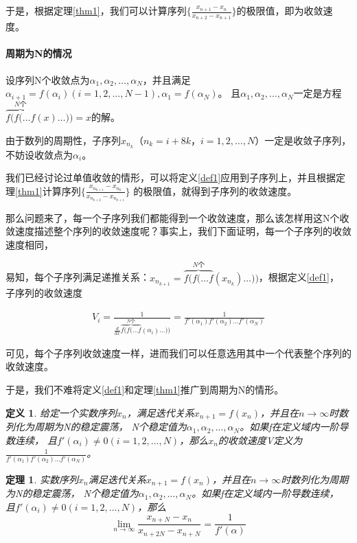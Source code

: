 \documentclass[10pt, a4paper]{article}
\newtheorem{definition}{\hspace{2em}定义}
\newtheorem{theorem}{\hspace{2em}定理}
\begin{document}
        于是，根据定理\ref{thm1}，我们可以计算序列$\{\frac{x_{n+1}-x_n}{x_{n+2}-x_{n+1}}\}$的极限值，即为收敛速度。

    \paragraph{周期为N的情况}

    设序列N个收敛点为$\alpha_1,\alpha_2,\dots ,\alpha_N$，并且满足$\alpha_{i+1}=f(\alpha_i)(i=1,2,\dots,N-1),\alpha_1=f(\alpha_N)$。
    且$\alpha_1,\alpha_2,\dots ,\alpha_N$一定是方程$\overbrace{f(f(\dots f}^{N\text{个}}(x)\dots))=x$的解。

    由于数列的周期性，子序列{$x_{n_k}$}（$n_k=i+8k，i=1,2,\dots,N$）一定是收敛子序列，不妨设收敛点为$\alpha_i$。

    我们已经讨论过单值收敛的情形，可以将定义\ref{def1}应用到子序列上，并且根据定理\ref{thm1}计算序列$\{\frac{x_{n_{k+1}}-x_{n_k}}{x_{n_{k+2}}-x_{n_{k+1}}}\}$
    的极限值，就得到子序列的收敛速度。

    那么问题来了，每一个子序列我们都能得到一个收敛速度，那么该怎样用这N个收敛速度描述整个序列的收敛速度呢？事实上，我们下面证明，每一个子序列的收敛速度相同，
    
    易知，每个子序列满足递推关系：$x_{n_{k+1}}=\overbrace{f(f(\dots f}^{N\text{个}}(x_{n_k})\dots))$，根据定义\ref{def1}，
    子序列的收敛速度
    
    \begin{align}
        V_i=\frac{1}{\frac{d}{dx}\overbrace{f(f(\dots f}^{N\text{个}}(\alpha_i)\dots))}=\frac{1}{f'(\alpha_1)f'(\alpha_2)\dots f'(\alpha_N)}
    \end{align}\label{每个子序列收敛速度一样}
    
    可见，每个子序列收敛速度一样，进而我们可以任意选用其中一个代表整个序列的收敛速度。

    于是，我们不难将定义\ref{def1}和定理\ref{thm1}推广到周期为N的情形。

    \begin{definition}\label{def2}
        给定一个实数序列${x_n}$，满足迭代关系$x_{n+1}=f(x_n)$，并且在$n \to \infty$时数列化为周期为N的稳定震荡，
        N个稳定值为$\alpha_1,\alpha_2,\dots ,\alpha_N$。如果f在定义域内一阶导数连续，
        且$f'(\alpha_i)\neq 0(i=1,2,\dots,N)$，那么${x_n}$的收敛速度V定义为$\frac{1}{f'(\alpha_1)f'(\alpha_2)\dots f'(\alpha_N)}$。
    \end{definition}

    \begin{theorem}\label{thm2}
        实数序列${x_n}$满足迭代关系$x_{n+1}=f(x_n)$，并且在$n \to \infty$时数列化为周期为N的稳定震荡，
        N个稳定值为$\alpha_1,\alpha_2,\dots ,\alpha_N$。如果f在定义域内一阶导数连续，
        且$f'(\alpha_i)\neq 0(i=1,2,\dots,N)$，那么
        \begin{equation*}
            \lim_{n \to \infty}\frac{x_{n+N}-x_n}{x_{n+2N}-x_{n+N}}=\frac{1}{f'(\alpha)}
        \end{equation*}
    \end{theorem}
\end{document}
